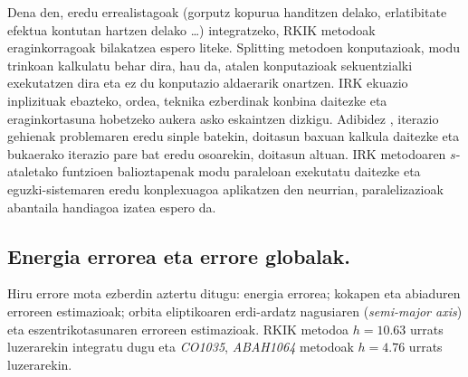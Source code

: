 

Dena den, eredu errealistagoak (gorputz kopurua handitzen delako,  erlatibitate efektua kontutan hartzen delako \dots) integratzeko, RKIK metodoak eraginkorragoak bilakatzea espero liteke. Splitting metodoen konputazioak, modu trinkoan kalkulatu behar dira, hau da, atalen konputazioak sekuentzialki exekutatzen dira eta  ez du konputazio aldaerarik onartzen. IRK ekuazio inplizituak ebazteko, ordea, teknika ezberdinak konbina daitezke eta eraginkortasuna hobetzeko aukera asko eskaintzen dizkigu. Adibidez \cite{Beylkin2014}, iterazio gehienak problemaren eredu sinple batekin, doitasun baxuan kalkula daitezke  eta bukaerako iterazio pare bat eredu osoarekin, doitasun altuan. IRK metodoaren $s$-ataletako funtzioen balioztapenak  modu paraleloan exekutatu daitezke eta eguzki-sistemaren eredu konplexuagoa aplikatzen den neurrian, paralelizazioak abantaila handiagoa izatea espero da.


\subsection*{Energia errorea eta errore globalak.}

Hiru errore mota ezberdin aztertu ditugu: energia errorea; kokapen eta abiaduren erroreen estimazioak; orbita eliptikoaren erdi-ardatz nagusiaren (\emph{semi-major axis}) eta eszentrikotasunaren erroreen estimazioak. RKIK metodoa $h=10.63$ urrats luzerarekin integratu dugu eta  \emph{CO1035}, \emph{ABAH1064} metodoak $h=4.76$ urrats luzerarekin.


